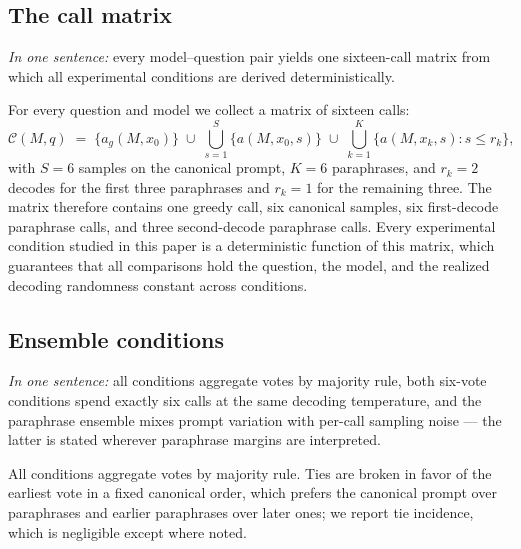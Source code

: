 \subsection{The call matrix}

\emph{In one sentence:} every model--question pair yields one sixteen-call matrix from which all experimental conditions are derived deterministically.

For every question and model we collect a matrix of sixteen calls:
\begin{equation}
\mathcal{C}(M, q) \;=\; \bigl\{ a_g(M, x_0) \bigr\} \;\cup\; \bigcup_{s=1}^{S} \bigl\{ a(M, x_0, s) \bigr\} \;\cup\; \bigcup_{k=1}^{K} \bigl\{ a(M, x_k, s) : s \le r_k \bigr\},
\label{eq:matrix}
\end{equation}
with $S = 6$ samples on the canonical prompt, $K = 6$ paraphrases, and $r_k = 2$ decodes for the first three paraphrases and $r_k = 1$ for the remaining three. The matrix therefore contains one greedy call, six canonical samples, six first-decode paraphrase calls, and three second-decode paraphrase calls. Every experimental condition studied in this paper is a deterministic function of this matrix, which guarantees that all comparisons hold the question, the model, and the realized decoding randomness constant across conditions.

\subsection{Ensemble conditions}
\label{sec:conditions}

\emph{In one sentence:} all conditions aggregate votes by majority rule, both six-vote conditions spend exactly six calls at the same decoding temperature, and the paraphrase ensemble mixes prompt variation with per-call sampling noise --- the latter is stated wherever paraphrase margins are interpreted.

All conditions aggregate votes by majority rule. Ties are broken in favor of the earliest vote in a fixed canonical order, which prefers the canonical prompt over paraphrases and earlier paraphrases over later ones; we report tie incidence, which is negligible except where noted.

